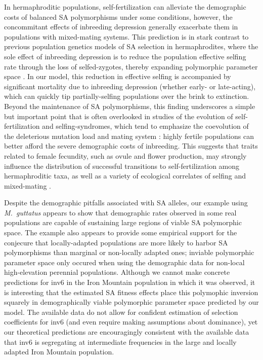 \documentclass[11pt]{article}
\begin{document}
In hermaphroditic populations, self-fertilization can alleviate the demographic costs of balanced SA polymorphisms under some conditions, however, the concommitant effects of inbreeding depression generally exacerbate them in populations with mixed-mating systems. This prediction is in stark contrast to previous population genetics models of SA selection in hermaphrodites, where the sole effect of inbreeding depression is to reduce the population effective selfing rate through the loss of selfed-zygotes, thereby expanding polymorphic parameter space \citep{JordanConnallon2014, Olito2017}. In our model, this reduction in effective selfing is accompanied by significant mortality due to inbreeding depression (whether early- or late-acting), which can quickly tip partially-selfing populations over the brink to extinction. Beyond the maintenance of SA polymorphisms, this finding underscores a simple but important point that is often overlooked in studies of the evolution of self-fertilization and selfing-syndromes, which tend to emphasize the coevolution of the deleterious mutation load and mating system \citep[e.g.,][]{Charlesworth1987, LandeSchemske1985, Goodwillie2005}: highly fertile populations can better afford the severe demographic costs of inbreeding. This suggests that traits related to female fecundity, such as ovule and flower production, may strongly influence the distribution of successful transitions to self-fertilization among hermaphroditic taxa, as well as a variety of ecological correlates of selfing and mixed-mating \citep{Goodwillie2005, Igic2006, Grossenbacher2015}.

Despite the demographic pitfalls associated with SA alleles, our example using {\itshape M.~guttatus} appears to show that demographic rates observed in some real populations are capable of sustaining large regions of viable SA polymorphic space. The example also appears to provide some empirical support for the conjecure that locally-adapted populations are more likely to harbor SA polymorphisms than marginal or non-locally adapted ones; inviable polymorphic parameter space only occured when using the demographic data for non-local high-elevation perennial populations. Although we cannot make concrete predictions for inv6 in the Iron Mountain population in which it was observed, it is interesting that the estimated SA fitness effects place this polymophic inversion squarely in demographically viable polymorphic parameter space predicted by our model. The available data do not allow for confident estimation of selection coefficients for inv6 (and even require making assumptions about dominance), yet our theoretical predictions are encouragingly consistent with the available data that inv6 is segregating at intermediate frequencies in the large and locally adapted Iron Mountain population. 
\end{document}
